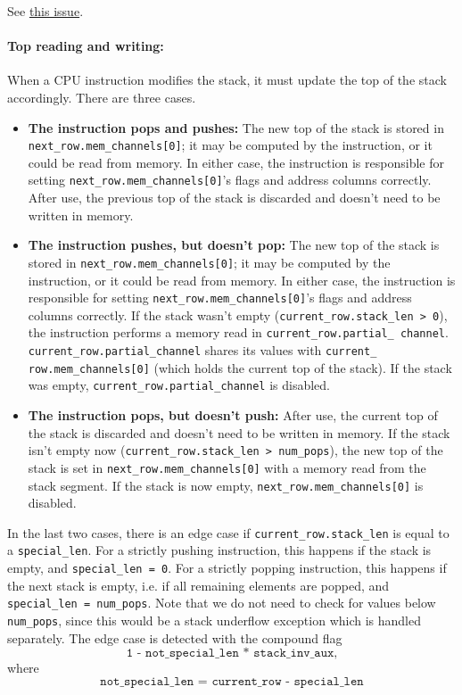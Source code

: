 See \href{https://github.com/0xPolygonZero/plonky2/issues/1149}{this issue}.

\paragraph*{Top reading and writing:}

When a CPU instruction modifies the stack, it must update the top of the stack accordingly. There are three cases.

\begin{itemize}
  \item \textbf{The instruction pops and pushes:} The new top of the stack is stored in \texttt{next\_row.mem\_channels[0]}; it may be computed by the instruction,
or it could be read from memory. In either case, the instruction is responsible for setting \texttt{next\_row.mem\_channels[0]}'s flags and address columns correctly.
After use, the previous top of the stack is discarded and doesn't need to be written in memory.
  \item \textbf{The instruction pushes, but doesn't pop:} The new top of the stack is stored in \texttt{next\_row.mem\_channels[0]}; it may be computed by the instruction,
or it could be read from memory. In either case, the instruction is responsible for setting \texttt{next\_row.mem\_channels[0]}'s flags and address columns correctly.
If the stack wasn't empty (\texttt{current\_row.stack\_len > 0}), the instruction performs a memory read in \texttt{current\_row.partial\_ channel}. \texttt{current\_row.partial\_channel}
shares its values with \texttt{current\_ row.mem\_channels[0]} (which holds the current top of the stack). If the stack was empty, \texttt{current\_row.partial\_channel}
is disabled.
  \item \textbf{The instruction pops, but doesn't push:} After use, the current top of the stack is discarded and doesn't need to be written in memory.
If the stack isn't empty now (\texttt{current\_row.stack\_len > num\_pops}), the new top of the stack is set in \texttt{next\_row.mem\_channels[0]}
with a memory read from the stack segment. If the stack is now empty, \texttt{next\_row.mem\_channels[0]} is disabled.
\end{itemize}

In the last two cases, there is an edge case if \texttt{current\_row.stack\_len} is equal to a \texttt{special\_len}. For a strictly pushing instruction,
this happens if the stack is empty, and \texttt{special\_len = 0}. For a strictly popping instruction, this happens if the next stack is empty, i.e. if
all remaining elements are popped, and \texttt{special\_len = num\_pops}. Note that we do not need to check for values below \texttt{num\_pops}, since this
would be a stack underflow exception which is handled separately.
The edge case is detected with the compound flag
$$\texttt{1 - not\_special\_len * stack\_inv\_aux,}$$
where $$\texttt{not\_special\_len = current\_row - special\_len}$$


